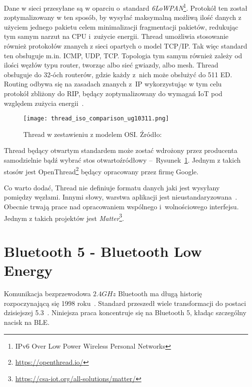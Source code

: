 Dane w sieci przesyłane są w oparciu o~standard \textit{6LoWPAN}\footnote{IPv6 Over Low Power Wireless Personal Networks}.
Protokół ten został zoptymalizowany w ten sposób, by wysyłać maksymalną możliwą ilość danych z użyciem jednego
pakietu celem minimalizacji fragmentacji pakietów, redukując tym samym narzut na CPU i~zużycie energii.
Thread umożliwia stosowanie również protokołów znanych z sieci opartych o model TCP/IP. Tak więc
standard ten obsługuje m.in. \gls{ICMP}, \gls{UDP}, \gls{TCP}. Topologia tym samym również zależy od ilości
węzłów typu router, tworząc albo sieć gwiazdy, albo mesh. Thread obsługuje do 32-óch routerów, gdzie każdy
z~nich może obsłużyć do 511 \gls{ED}. Routing odbywa się na zasadach znanych z~\gls{IP}
wykorzystując w tym celu protokół zbliżony do \gls{RIP}, będący zoptymalizowany do wymagań
IoT pod względem zużycia energii~\cite{silicon_laboratories_ug10311_2022}.

\begin{figure}[!ht]
	\centering \texttt{[image: thread\_iso\_comparison\_ug10311.png]}
	\caption{Thread w zestawieniu z modelem OSI. Źródło:~\cite{silicon_laboratories_ug10311_2022}}
	\label{rys:thread_iso_comparison_ug10311}
\end{figure}

Thread będący otwartym standardem może zostać wdrożony przez producenta samodzielnie bądź wybrać stos otwartoźródłowy --~Rysunek~\ref{rys:thread_iso_comparison_ug10311}.
Jednym z takich stosów jest OpenThread\footnote{\url{https://openthread.io/}} będący opracowany przez firmę Google.

Co warto dodać, Thread nie definiuje formatu danych jaki jest wysyłany pomiędzy węzłami. Innymi słowy,
warstwa aplikacji jest nieustandaryzowana~\cite{silicon_laboratories_ug10311_2022}. Obecnie trwają
prace nad opracowaniem wspólnego i~wolnościowego interfejsu. Jednym z takich projektów jest \textit{Matter}\footnote{\url{https://csa-iot.org/all-solutions/matter/}}.

\section{Bluetooth 5 - Bluetooth Low Energy}
Komunikacja bezprzewodowa $2.4GHz$ Bluetooth ma długą historię rozpoczynającą się 1998 roku~\cite{noauthor_bluetooth_nodate-1}.
Standard przeszedł wiele transformacji do postaci dzisiejszej 5.3~\cite{woolley_bluetooth_2021}. Niniejsza praca
koncentruje się na Bluetooth 5, kładąc szczególny nacisk na \gls{BLE}.

